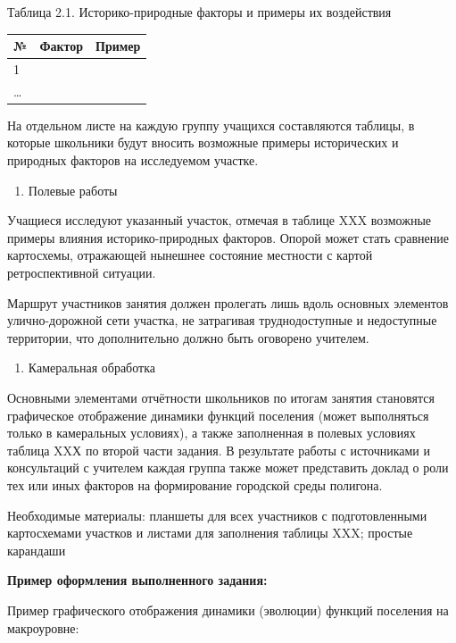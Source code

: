 \documentclass[
  11pt,
  russian,
]{book}
\providecommand{\tightlist}{%
  \setlength{\itemsep}{0pt}\setlength{\parskip}{0pt}}
\begin{document}
Таблица 2.1. Историко-природные факторы и примеры их воздействия

\begin{longtable}[]{@{}lll@{}}
\toprule
№ & Фактор & Пример \\
\midrule
\endhead
1 & ~ & ~ \\
\ldots{} & ~ & ~ \\
\bottomrule
\end{longtable}

На отдельном листе на каждую группу учащихся составляются таблицы, в которые школьники будут вносить возможные примеры исторических и природных факторов на исследуемом участке.

\begin{enumerate}
\def\labelenumi{\arabic{enumi}.}
\setcounter{enumi}{1}
\tightlist
\item
  Полевые работы
\end{enumerate}

Учащиеся исследуют указанный участок, отмечая в таблице XXX возможные примеры влияния историко-природных факторов. Опорой может стать сравнение картосхемы, отражающей нынешнее состояние местности с картой ретроспективной ситуации.

Маршрут участников занятия должен пролегать лишь вдоль основных элементов улично-дорожной сети участка, не затрагивая труднодоступные и недоступные территории, что дополнительно должно быть оговорено учителем.

\begin{enumerate}
\def\labelenumi{\arabic{enumi}.}
\setcounter{enumi}{2}
\tightlist
\item
  Камеральная обработка
\end{enumerate}

Основными элементами отчётности школьников по итогам занятия становятся графическое отображение динамики функций поселения (может выполняться только в камеральных условиях), а также заполненная в полевых условиях таблица XXХ по второй части задания. В результате работы с источниками и консультаций с учителем каждая группа также может представить доклад о роли тех или иных факторов на формирование городской среды полигона.

Необходимые материалы: планшеты для всех участников с подготовленными картосхемами участков и листами для заполнения таблицы XXX; простые карандаши

\textbf{Пример оформления выполненного задания:}

Пример графического отображения динамики (эволюции) функций поселения на макроуровне:
\end{document}
